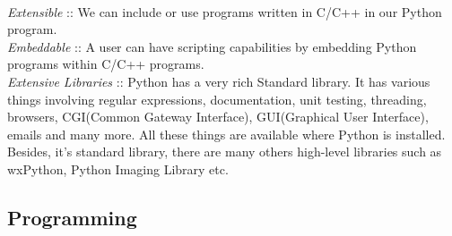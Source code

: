 \\
\linebreak
\textit{Extensible}	::	We can include or use programs written in C/C++ in our Python program.
\\
\linebreak
\textit{Embeddable}	::	A user can have scripting capabilities by embedding Python programs within C/C++ programs. 
\\
\linebreak
\textit{Extensive Libraries}	::	Python has a very rich Standard library. It has various things involving regular expressions, documentation, unit testing, threading, browsers, CGI(Common Gateway Interface), GUI(Graphical User Interface), emails and many more. All these things are available where Python is installed.
Besides, it's standard library, there are many others high-level libraries such as wxPython, Python Imaging Library etc.
\\
\linebreak
\subsection{Programming}
